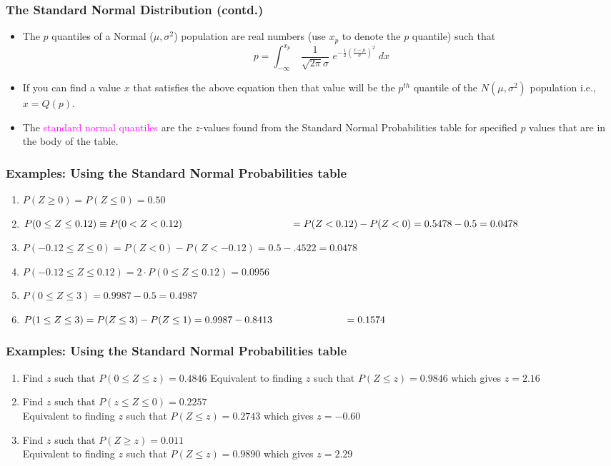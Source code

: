\documentclass[xcolor=dvipsnames,12pt]{beamer}
\begin{document}
\begin{frame}
\frametitle{The Standard Normal Distribution (contd.)}
\begin{itemize}
\item The $p$ quantiles of  a Normal ($\mu,\sigma^2$) 
population are real numbers (use $x_p$ to denote the $p$  quantile) such that
$$
  p = \int_{-\infty}^{x_p} \;
\frac{1}{\sqrt{2\pi}\sigma} \, \,e^{-\frac12(\frac{x-\mu}{\sigma})^2} \; dx
$$
\item If you can find a value $x$ that satisfies the above equation
then that value will be the $p^{th}$ quantile of the
$N(\mu,\sigma^2)$ population i.e., $x = Q(p)$.
\item The \textcolor{magenta}{standard normal quantiles} are the $z$-values found from the
Standard Normal Probabilities table for specified $p$ values that are in the body of the table.
\end{itemize}
\end{frame}


\begin{frame}
\frametitle{Examples:  Using  the
Standard Normal Probabilities table }
\begin{enumerate}
\item $P(Z \geq 0) = P(Z \leq 0) = 0.50$
\item $P(0 \leq Z \leq 0.12) \equiv P(0 < Z < 0.12) 
 \hspace*{1.5in}=P(Z<0.12)-P(Z<0)=0.5478-0.5 = 0.0478$
 \item $P(-0.12 \leq Z \leq 0) =P(Z<0)-P(Z<-0.12)
 = 0.5-.4522=0.0478$
\item $P(-0.12 \leq Z \leq 0.12) = 2 \cdot P(0 \leq Z \leq 0.12) = 0.0956$
\item $P(0 \leq Z \leq 3) = 0.9987-0.5=0.4987$
\item $P(1 \leq Z \leq 3 ) = P(Z \leq 3)- P(Z \leq 1) = 0.9987 - 0.8413
\hspace*{1in}=0.1574$
\end{enumerate}
\end{frame}




\begin{frame}
\frametitle{Examples:  Using  the
Standard Normal Probabilities table }
\begin{enumerate}
\item Find $z$ such that $P(0 \leq Z \leq z) = 0.4846$ 
      Equivalent to finding $z$ such that $P(Z \leq z) = 0.9846$ which gives $z = 2.16$   
\item Find $z$ such that $P(z \leq Z \leq 0) = 0.2257$\\
      Equivalent to finding $z$ such that $P(Z \leq z) = 0.2743$ which gives  $z = -0.60$
\item Find $z$ such that $P(Z \geq z) = 0.011$\\
      Equivalent to finding $z$ such that $P(Z \leq z) = 0.9890$ which gives  $z = 2.29$
\end{enumerate}
\end{frame}
\end{document}
